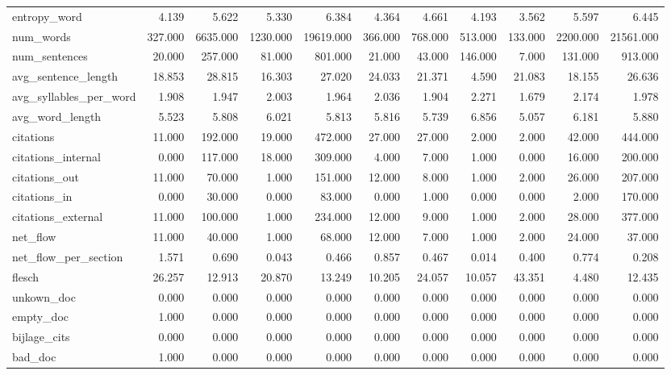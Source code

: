 \begin{tabular}{lrrrrrrrrrr}
\cline{1-11}
entropy\_word & 4.139 & 5.622 & 5.330 & 6.384 & 4.364 & 4.661 & 4.193 & 3.562 & 5.597 & 6.445 \\
\cline{1-11}
num\_words & 327.000 & 6635.000 & 1230.000 & 19619.000 & 366.000 & 768.000 & 513.000 & 133.000 & 2200.000 & 21561.000 \\
\cline{1-11}
num\_sentences & 20.000 & 257.000 & 81.000 & 801.000 & 21.000 & 43.000 & 146.000 & 7.000 & 131.000 & 913.000 \\
\cline{1-11}
avg\_sentence\_length & 18.853 & 28.815 & 16.303 & 27.020 & 24.033 & 21.371 & 4.590 & 21.083 & 18.155 & 26.636 \\
\cline{1-11}
avg\_syllables\_per\_word & 1.908 & 1.947 & 2.003 & 1.964 & 2.036 & 1.904 & 2.271 & 1.679 & 2.174 & 1.978 \\
\cline{1-11}
avg\_word\_length & 5.523 & 5.808 & 6.021 & 5.813 & 5.816 & 5.739 & 6.856 & 5.057 & 6.181 & 5.880 \\
\cline{1-11}
citations & 11.000 & 192.000 & 19.000 & 472.000 & 27.000 & 27.000 & 2.000 & 2.000 & 42.000 & 444.000 \\
\cline{1-11}
citations\_internal & 0.000 & 117.000 & 18.000 & 309.000 & 4.000 & 7.000 & 1.000 & 0.000 & 16.000 & 200.000 \\
\cline{1-11}
citations\_out & 11.000 & 70.000 & 1.000 & 151.000 & 12.000 & 8.000 & 1.000 & 2.000 & 26.000 & 207.000 \\
\cline{1-11}
citations\_in & 0.000 & 30.000 & 0.000 & 83.000 & 0.000 & 1.000 & 0.000 & 0.000 & 2.000 & 170.000 \\
\cline{1-11}
citations\_external & 11.000 & 100.000 & 1.000 & 234.000 & 12.000 & 9.000 & 1.000 & 2.000 & 28.000 & 377.000 \\
\cline{1-11}
net\_flow & 11.000 & 40.000 & 1.000 & 68.000 & 12.000 & 7.000 & 1.000 & 2.000 & 24.000 & 37.000 \\
\cline{1-11}
net\_flow\_per\_section & 1.571 & 0.690 & 0.043 & 0.466 & 0.857 & 0.467 & 0.014 & 0.400 & 0.774 & 0.208 \\
\cline{1-11}
flesch & 26.257 & 12.913 & 20.870 & 13.249 & 10.205 & 24.057 & 10.057 & 43.351 & 4.480 & 12.435 \\
\cline{1-11}
unkown\_doc & 0.000 & 0.000 & 0.000 & 0.000 & 0.000 & 0.000 & 0.000 & 0.000 & 0.000 & 0.000 \\
\cline{1-11}
empty\_doc & 1.000 & 0.000 & 0.000 & 0.000 & 0.000 & 0.000 & 0.000 & 0.000 & 0.000 & 0.000 \\
\cline{1-11}
bijlage\_cits & 0.000 & 0.000 & 0.000 & 0.000 & 0.000 & 0.000 & 0.000 & 0.000 & 0.000 & 0.000 \\
\cline{1-11}
bad\_doc & 1.000 & 0.000 & 0.000 & 0.000 & 0.000 & 0.000 & 0.000 & 0.000 & 0.000 & 0.000 \\
\cline{1-11}
\bottomrule
\end{tabular}
